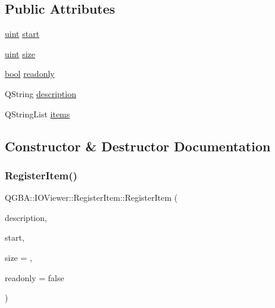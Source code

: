 \subsection*{Public Attributes}
\begin{DoxyCompactItemize}
\item 
\mbox{\hyperlink{gzlog_8c_a91ad9478d81a7aaf2593e8d9c3d06a14}{uint}} \mbox{\hyperlink{struct_q_g_b_a_1_1_i_o_viewer_1_1_register_item_a84857e8cdc8faa8cc39ab64c05f8ef79}{start}}
\item 
\mbox{\hyperlink{gzlog_8c_a91ad9478d81a7aaf2593e8d9c3d06a14}{uint}} \mbox{\hyperlink{struct_q_g_b_a_1_1_i_o_viewer_1_1_register_item_ac70a4095fc18f8ca0407787202757654}{size}}
\item 
\mbox{\hyperlink{libretro_8h_a4a26dcae73fb7e1528214a068aca317e}{bool}} \mbox{\hyperlink{struct_q_g_b_a_1_1_i_o_viewer_1_1_register_item_a0547b6e1e4b98cb24c337f84970b7812}{readonly}}
\item 
Q\+String \mbox{\hyperlink{struct_q_g_b_a_1_1_i_o_viewer_1_1_register_item_a7e8eebd394fa7db99571880304a78536}{description}}
\item 
Q\+String\+List \mbox{\hyperlink{struct_q_g_b_a_1_1_i_o_viewer_1_1_register_item_a98f9b04e73a6a268158a7c45ce4a4e7b}{items}}
\end{DoxyCompactItemize}


\subsection{Constructor \& Destructor Documentation}
\mbox{\label{struct_q_g_b_a_1_1_i_o_viewer_1_1_register_item_a2dcf5e74837bbc304dd218aaa3afd649}} 
\subsubsection{\texorpdfstring{Register\+Item()}{RegisterItem()}\hspace{0.1cm}{\footnotesize\ttfamily [1/2]}}
{\footnotesize\ttfamily Q\+G\+B\+A\+::\+I\+O\+Viewer\+::\+Register\+Item\+::\+Register\+Item (\begin{DoxyParamCaption}\item[{const Q\+String \&}]{description,  }\item[{\mbox{\hyperlink{gzlog_8c_a91ad9478d81a7aaf2593e8d9c3d06a14}{uint}}}]{start,  }\item[{\mbox{\hyperlink{gzlog_8c_a91ad9478d81a7aaf2593e8d9c3d06a14}{uint}}}]{size = {},  }\item[{\mbox{\hyperlink{libretro_8h_a4a26dcae73fb7e1528214a068aca317e}{bool}}}]{readonly = {\ttfamily false} }\end{DoxyParamCaption})\hspace{0.3cm}{\ttfamily [inline]}}

